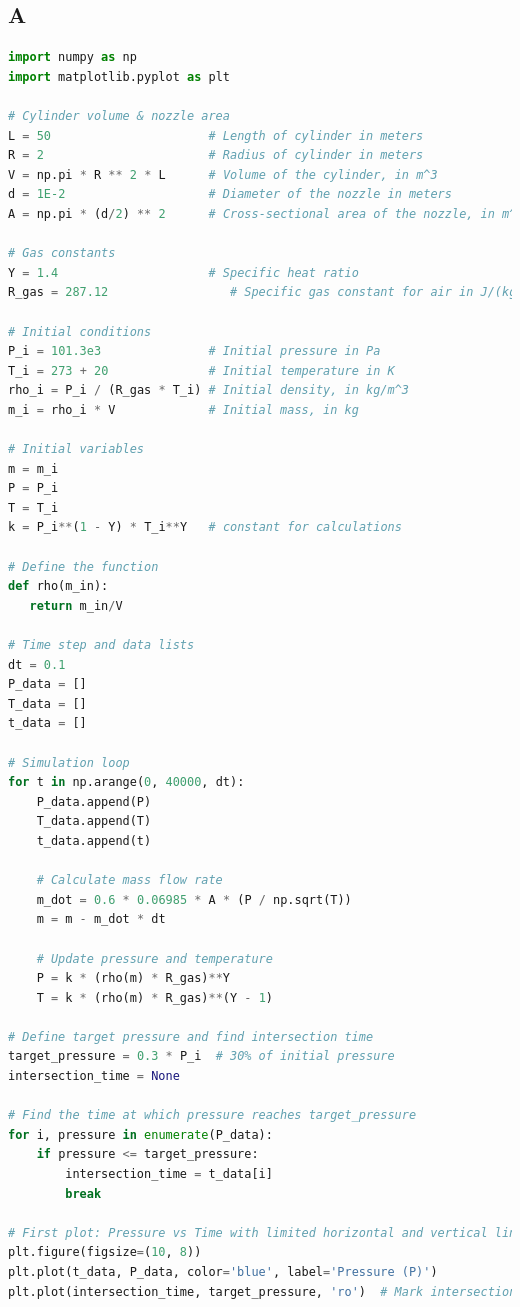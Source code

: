 \documentclass[a4paper, 14pt]{extarticle}
\begin{document}
\subsection*{A}
\begin{lstlisting}[language=Python]
import numpy as np
import matplotlib.pyplot as plt

# Cylinder volume & nozzle area
L = 50                      # Length of cylinder in meters
R = 2                       # Radius of cylinder in meters
V = np.pi * R ** 2 * L      # Volume of the cylinder, in m^3
d = 1E-2                    # Diameter of the nozzle in meters
A = np.pi * (d/2) ** 2      # Cross-sectional area of the nozzle, in m^2

# Gas constants 
Y = 1.4                     # Specific heat ratio
R_gas = 287.12                 # Specific gas constant for air in J/(kg*K)

# Initial conditions
P_i = 101.3e3               # Initial pressure in Pa
T_i = 273 + 20              # Initial temperature in K
rho_i = P_i / (R_gas * T_i) # Initial density, in kg/m^3
m_i = rho_i * V             # Initial mass, in kg

# Initial variables
m = m_i
P = P_i
T = T_i
k = P_i**(1 - Y) * T_i**Y   # constant for calculations

# Define the function
def rho(m_in):
   return m_in/V

# Time step and data lists
dt = 0.1
P_data = []
T_data = []
t_data = []

# Simulation loop
for t in np.arange(0, 40000, dt):
    P_data.append(P)
    T_data.append(T)
    t_data.append(t)

    # Calculate mass flow rate
    m_dot = 0.6 * 0.06985 * A * (P / np.sqrt(T))
    m = m - m_dot * dt

    # Update pressure and temperature
    P = k * (rho(m) * R_gas)**Y
    T = k * (rho(m) * R_gas)**(Y - 1)

# Define target pressure and find intersection time
target_pressure = 0.3 * P_i  # 30% of initial pressure
intersection_time = None

# Find the time at which pressure reaches target_pressure
for i, pressure in enumerate(P_data):
    if pressure <= target_pressure:
        intersection_time = t_data[i]
        break
    
# First plot: Pressure vs Time with limited horizontal and vertical lines, with time axis starting from zero
plt.figure(figsize=(10, 8))
plt.plot(t_data, P_data, color='blue', label='Pressure (P)')
plt.plot(intersection_time, target_pressure, 'ro')  # Mark intersection point


\end{lstlisting}
\end{document}
